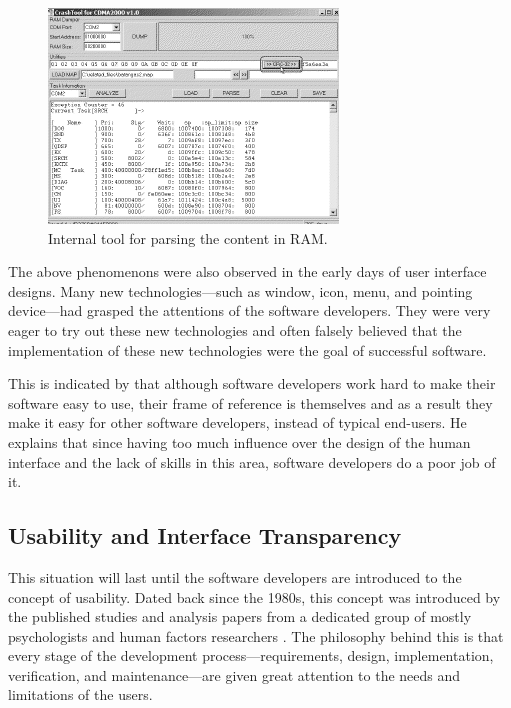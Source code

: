 \documentclass{acm_proc_article-sp}
\begin{document}
\begin{figure}[!t]
\centering
\includegraphics[width=.7\columnwidth]{featureful}
\caption{Internal tool for parsing the content in RAM.}
\label{fig:featureful}
\end{figure}

The above phenomenons were also observed in the early days of user
interface designs. Many new technologies---such as window, icon, menu,
and pointing device---had grasped the attentions of the software
developers. They were very eager to try out these new technologies and
often falsely believed that the implementation of these new
technologies were the goal of successful software.

This is indicated by \citet{inmates:cooper} that although software
developers work hard to make their software easy to use, their frame
of reference is themselves and as a result they make it easy for other
software developers, instead of typical end-users. He explains that
since having too much influence over the design of the human interface
and the lack of skills in this area, software developers do a poor job
of it.

\subsection{Usability and Interface Transparency}
This situation will last until the software developers are introduced
to the concept of usability. Dated back since the 1980s, this concept
was introduced by the published studies and analysis papers from a
dedicated group of mostly psychologists and human factors researchers
\citep{human:rubinstein, friendly:simpson, human:shneiderman,
  human:brown, software:dumas}. The philosophy behind this is that
every stage of the development process---requirements, design,
implementation, verification, and maintenance---are given great
attention to the needs and limitations of the users.
\end{document}
